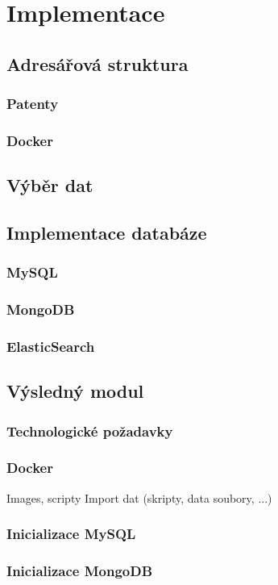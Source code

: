 \chapter{Implementace}

\section{Adresářová struktura}
\subsection{Patenty}
\subsection{Docker}

\section{Výběr dat}


\section{Implementace databáze}
\subsection{MySQL}
\subsection{MongoDB}
\subsection{ElasticSearch}

\section{Výsledný modul}
\subsection{Technologické požadavky}
\subsection{Docker}
Images, scripty \newline
Import dat (skripty, data soubory, ...) 
\subsection{Inicializace MySQL}
\subsection{Inicializace MongoDB}